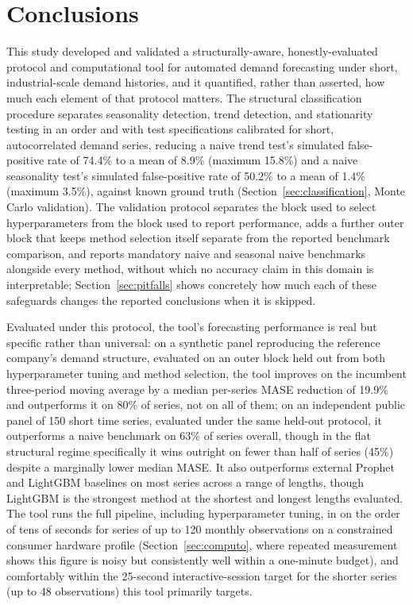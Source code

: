 \documentclass[forecasting,article,submit,pdftex,moreauthors]{Definitions/mdpi}
\begin{document}
\section{Conclusions}
\label{sec:conclusions}

This study developed and validated a structurally-aware, honestly-evaluated protocol and computational tool for automated demand forecasting under short, industrial-scale demand histories, and it quantified, rather than asserted, how much each element of that protocol matters. The structural classification procedure separates seasonality detection, trend detection, and stationarity testing in an order and with test specifications calibrated for short, autocorrelated demand series, reducing a naive trend test's simulated false-positive rate of 74.4\% to a mean of 8.9\% (maximum 15.8\%) and a naive seasonality test's simulated false-positive rate of 50.2\% to a mean of 1.4\% (maximum 3.5\%), against known ground truth (Section~\ref{sec:classification}, Monte Carlo validation). The validation protocol separates the block used to select hyperparameters from the block used to report performance, adds a further outer block that keeps method selection itself separate from the reported benchmark comparison, and reports mandatory naive and seasonal naive benchmarks alongside every method, without which no accuracy claim in this domain is interpretable; Section~\ref{sec:pitfalls} shows concretely how much each of these safeguards changes the reported conclusions when it is skipped.

Evaluated under this protocol, the tool's forecasting performance is real but specific rather than universal: on a synthetic panel reproducing the reference company's demand structure, evaluated on an outer block held out from both hyperparameter tuning and method selection, the tool improves on the incumbent three-period moving average by a median per-series MASE reduction of 19.9\% and outperforms it on 80\% of series, not on all of them; on an independent public panel of 150 short time series, evaluated under the same held-out protocol, it outperforms a naive benchmark on 63\% of series overall, though in the flat structural regime specifically it wins outright on fewer than half of series (45\%) despite a marginally lower median MASE. It also outperforms external Prophet and LightGBM baselines on most series across a range of lengths, though LightGBM is the strongest method at the shortest and longest lengths evaluated. The tool runs the full pipeline, including hyperparameter tuning, in on the order of tens of seconds for series of up to 120 monthly observations on a constrained consumer hardware profile (Section~\ref{sec:computo}, where repeated measurement shows this figure is noisy but consistently well within a one-minute budget), and comfortably within the 25-second interactive-session target for the shorter series (up to 48 observations) this tool primarily targets.
\end{document}
